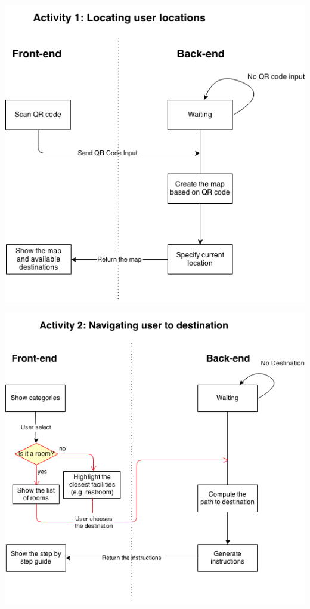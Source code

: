 \documentclass[12pt]{article}
\begin{document}
\begin{center}
\includegraphics[scale=0.6]{image/image00.png}
\end{center}

\begin{center}
\includegraphics[scale=0.6]{image/image02.png}
\end{center}
\end{document}
